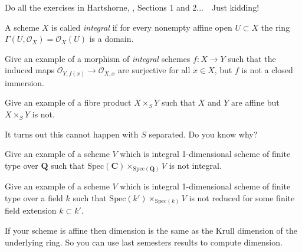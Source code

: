 \begin{exercise}
\label{exercise-just-kidding}
Do all the exercises in Hartshorne, \cite[Chapter II]{H},
Sections 1 and 2...\ \ Just kidding!
\end{exercise}

\begin{definition}
\label{definition-integral}
A scheme $X$ is called {\it integral} if for every nonempty affine
open $U \subset X$ the ring $\Gamma(U, \mathcal{O}_X) = \mathcal{O}_X(U)$
is a domain.
\end{definition}

\begin{exercise}
\label{exercise-morphism-integral-schemes-surjective-stalks-not-closed}
Give an example of a morphism of {\it integral}
schemes $f : X \to Y$ such that the induced maps ${\mathcal O}_{Y, f(x)}
\to {\mathcal O}_{X, x}$ are surjective for all $x\in X$, but $f$
is not a closed immersion.
\end{exercise}

\begin{exercise}
\label{exercise-fibre-product-affines-not-affine}
Give an example of a fibre product $X\times_S Y$ such that $X$ and $Y$
are affine but $X\times_S Y$ is not.
\end{exercise}

\begin{remark}
\label{remark-separated-base-fibre-product-affines-affine}
It turns out this cannot happen with $S$ separated. Do you know why?
\end{remark}

\begin{exercise}
\label{exercise-not-geometrically-integral}
Give an example of a scheme
$V$ which is integral 1-dimensional scheme of finite type
over ${\mathbf Q}$ such that
$\text{Spec}({\mathbf C}) \times_{\text{Spec}({\mathbf Q})} V$
is not integral.
\end{exercise}

\begin{exercise}
\label{exercise-not-geometrically-reduced}
Give an example of a scheme
$V$ which is integral 1-dimensional scheme of finite type
over a field $k$ such that $\text{Spec}(k') \times_{\text{Spec}(k)} V$
is not reduced for some finite field extension $k \subset k'$.
\end{exercise}

\begin{remark}
\label{remark-affine-dimension}
If your scheme is affine then dimension is the
same as the Krull dimension of the underlying ring. So you can
use last semesters results to compute dimension.
\end{remark}







